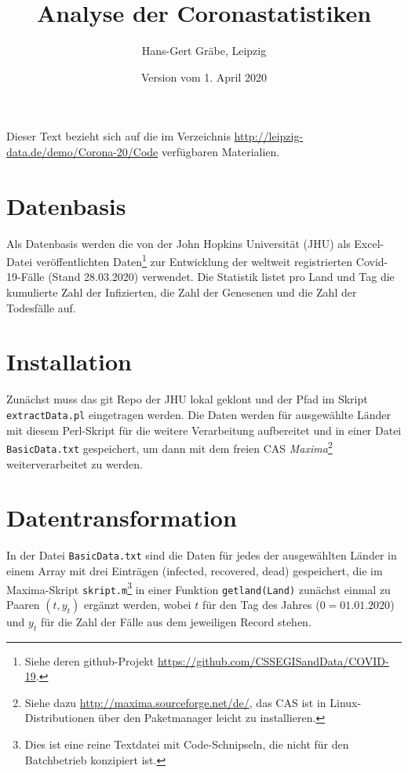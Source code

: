 \documentclass[a4paper,11pt]{article}
\title{Analyse der Coronastatistiken}
\author{Hans-Gert Gräbe, Leipzig}
\date{Version vom 1. April 2020}
\begin{document}
\maketitle

Dieser Text bezieht sich auf die im Verzeichnis
\url{http://leipzig-data.de/demo/Corona-20/Code} verfügbaren Materialien.

\section{Datenbasis}

Als Datenbasis werden die von der John Hopkins Universität (JHU) als
Excel-Datei veröffentlichten Daten\footnote{Siehe deren github-Projekt
  \url{https://github.com/CSSEGISandData/COVID-19}.} zur Entwicklung der
weltweit registrierten Covid-19-Fälle (Stand 28.03.2020) verwendet. Die
Statistik listet pro Land und Tag die kumulierte Zahl der Infizierten, die
Zahl der Genesenen und die Zahl der Todesfälle auf.

\section{Installation} 

Zunächst muss das git Repo der JHU lokal geklont und der Pfad im Skript
\texttt{extractData.pl} eingetragen werden.  Die Daten werden für ausgewählte
Länder mit diesem Perl-Skript für die weitere Verarbeitung aufbereitet und in
einer Datei \texttt{BasicData.txt} gespeichert, um dann mit dem freien CAS
\emph{Maxima}\footnote{Siehe dazu \url{http://maxima.sourceforge.net/de/}, das
  CAS ist in Linux-Distributionen über den Paketmanager leicht zu
  installieren.} weiterverarbeitet zu werden.

\section{Datentransformation}

In der Datei \texttt{BasicData.txt} sind die Daten für jedes der ausgewählten
Länder in einem Array mit drei Einträgen (infected, recovered, dead)
gespeichert, die im Maxima-Skript \texttt{skript.m}\footnote{Dies ist eine
  reine Textdatei mit Code-Schnipseln, die nicht für den Batchbetrieb
  konzipiert ist.} in einer Funktion \texttt{getland(Land)} zunächst einmal zu
Paaren $(t,y_t)$ ergänzt werden, wobei $t$ für den Tag des Jahres
($0=01.01.2020$) und $y_t$ für die Zahl der Fälle aus dem jeweiligen Record
stehen.
\end{document}
